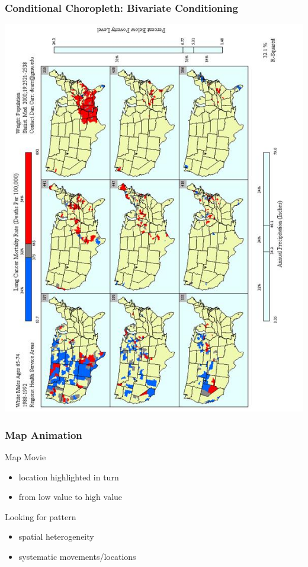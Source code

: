 \documentclass[nototal]{beamer}
\begin{document}
\begin{frame}
	\frametitle{Conditional Choropleth: Bivariate Conditioning}
 \begin{center}
 \includegraphics[angle=270,width=.85\linewidth]{conditionalchoropleth1.png}
  \end{center}
 \end{frame} 

\begin{frame}
	\frametitle{Map Animation}
 
\begin{block}{Map Movie}
 \begin{itemize}
 \item  location highlighted in turn
 \item  from low value to high value
 \end{itemize}
 \end{block} 
\begin{block}{Looking for pattern}
 \begin{itemize}
 \item  spatial  heterogeneity
 \item  systematic movements/locations
 \end{itemize}
 \end{block} \end{frame} 
\end{document}
